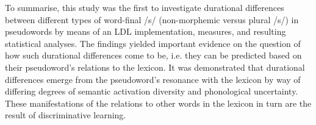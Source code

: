 To summarise, this study was the first to investigate durational differences between different types of word-final /s/ (non-morphemic versus plural /s/) in pseudowords by means of an LDL implementation, measures, and resulting statistical analyses. The findings yielded important evidence on the question of how such durational differences come to be, i.e. they can be predicted based on their pseudoword’s relations to the lexicon. It was demonstrated that durational differences emerge from the pseudoword’s resonance with the lexicon by way of differing degrees of semantic activation diversity and phonological uncertainty. These manifestations of the relations to other words in the lexicon in turn are the result of discriminative learning.
